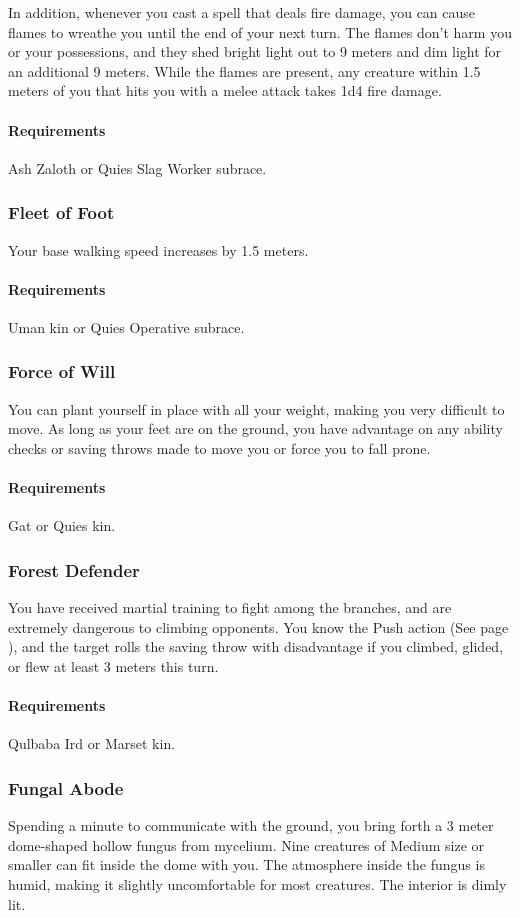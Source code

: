     In addition, whenever you cast a spell that deals fire damage, you can cause flames to wreathe you until the end of your next turn.
    The flames don't harm you or your possessions, and they shed bright light out to 9 meters and dim light for an additional 9 meters.
    While the flames are present, any creature within 1.5 meters of you that hits you with a melee attack takes 1d4 fire damage.
    \paragraph{Requirements} Ash Zaloth or Quies Slag Worker subrace.
\subsubsection{Fleet of Foot} \label{feat::fleetoffoot}
    Your base walking speed increases by 1.5 meters.
    \paragraph{Requirements} Uman kin or Quies Operative subrace.
\subsubsection{Force of Will} \label{feat::forceofwill}
    You can plant yourself in place with all your weight, making you very difficult to move.
    As long as your feet are on the ground, you have advantage on any ability checks or saving throws made to move you or force you to fall prone.
    \paragraph{Requirements} Gat or Quies kin.
\subsubsection{Forest Defender} \label{feat::forestdefender}
    You have received martial training to fight among the branches, and are extremely dangerous to climbing opponents.
    You know the Push action (See page \pageref{act::push}), and the target rolls the saving throw with disadvantage if you climbed, glided, or flew at least 3 meters this turn.
    \paragraph{Requirements} Qulbaba Ird or Marset kin.
\subsubsection{Fungal Abode} \label{feat::fungalabode}
    Spending a minute to communicate with the ground, you bring forth a 3 meter dome-shaped hollow fungus from mycelium.
    Nine creatures of Medium size or smaller can fit inside the dome with you.
    The atmosphere inside the fungus is humid, making it slightly uncomfortable for most creatures.
    The interior is dimly lit.

